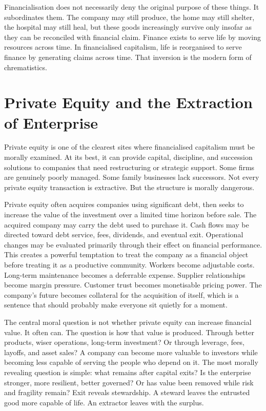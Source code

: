 \documentclass[11pt,a4paper,oneside]{book}
\begin{document}
Financialisation does not necessarily deny the original purpose of these things. It subordinates them. The company may still produce, the home may still shelter, the hospital may still heal, but these goods increasingly survive only insofar as they can be reconciled with financial claim. Finance exists to serve life by moving resources across time. In financialised capitalism, life is reorganised to serve finance by generating claims across time. That inversion is the modern form of chrematistics.

\section*{Private Equity and the Extraction of Enterprise}

Private equity is one of the clearest sites where financialised capitalism must be morally examined. At its best, it can provide capital, discipline, and succession solutions to companies that need restructuring or strategic support. Some firms are genuinely poorly managed. Some family businesses lack successors. Not every private equity transaction is extractive. But the structure is morally dangerous.

Private equity often acquires companies using significant debt, then seeks to increase the value of the investment over a limited time horizon before sale. The acquired company may carry the debt used to purchase it. Cash flows may be directed toward debt service, fees, dividends, and eventual exit. Operational changes may be evaluated primarily through their effect on financial performance. This creates a powerful temptation to treat the company as a financial object before treating it as a productive community. Workers become adjustable costs. Long-term maintenance becomes a deferrable expense. Supplier relationships become margin pressure. Customer trust becomes monetisable pricing power. The company's future becomes collateral for the acquisition of itself, which is a sentence that should probably make everyone sit quietly for a moment.

The central moral question is not whether private equity can increase financial value. It often can. The question is how that value is produced. Through better products, wiser operations, long-term investment? Or through leverage, fees, layoffs, and asset sales? A company can become more valuable to investors while becoming less capable of serving the people who depend on it. The most morally revealing question is simple: what remains after capital exits? Is the enterprise stronger, more resilient, better governed? Or has value been removed while risk and fragility remain? Exit reveals stewardship. A steward leaves the entrusted good more capable of life. An extractor leaves with the surplus.
\end{document}
